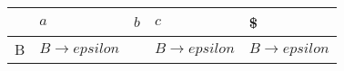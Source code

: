\documentclass{standalone}
\begin{document}
\begin{tabularx}{\textwidth}{XXXXX}
        & \(a\) & \(b\) & \(c\) & \$ \\
        \midrule
            B
            &
            \(B \to epsilon\)
            &
            
            &
            \(B \to epsilon\)
            &
            \(B \to epsilon\)
    \end{tabularx}
\end{document}
